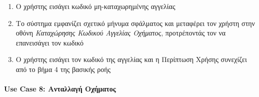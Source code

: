 \documentclass{../ol-softwaremanual}
\begin{document}
	\begin{enumerate}
		\item Ο χρήστης εισάγει κωδικό μη-καταχωρημένης αγγελίας
		\item Το σύστημα εμφανίζει σχετικό μήνυμα σφάλματος και μεταφέρει τον χρήστη στην οθόνη \textit{Καταχώρησης Κωδικού Αγγελίας Οχήματος}, προτρέποντάς τον να επανεισάγει τον κωδικό
		\item Ο χρήστης εισάγει τον κωδικό της αγγελίας και η Περίπτωση Χρήσης συνεχίζει από το βήμα 4 της βασικής ροής
	\end{enumerate}
	
	
	\paragraph{\en Use Case 8: \gr  Ανταλλαγή Οχήματος \gr}
	
\end{document}
